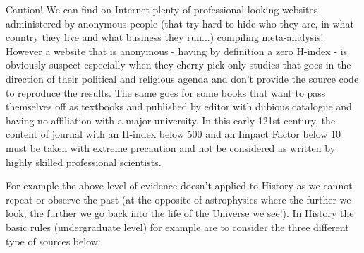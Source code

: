 	\begin{tcolorbox}[enhanced,colback=red!5!white,colframe=black!50!red,boxrule=1pt,arc=0pt,outer arc=0pt,drop lifted shadow,after skip=10pt plus 2pt]
	\bcbombe Caution! We can find on Internet plenty of professional looking websites administered by anonymous people (that try hard to hide who they are, in what country they live and what business they run...) compiling meta-analysis! However a website that is anonymous - having by definition a zero H-index - is obviously suspect especially when they cherry-pick only studies that goes in the direction of their political and religious agenda and don't provide the source code to reproduce the results. The same goes for some books that want to pass themselves off as textbooks and published by editor with dubious catalogue and having no affiliation with a major university. In this early 121st century, the content of journal with an H-index below 500 and an Impact Factor below 10 must be taken with extreme precaution and not be considered as written by highly skilled professional scientists.
	\end{tcolorbox}
	For example the above level of evidence doesn't applied to History as we cannot repeat or observe the past (at the opposite of astrophysics where the further we look, the further we go back into the life of the Universe we see!). In History the basic rules (undergraduate level) for example are to consider the three different type of sources below:
